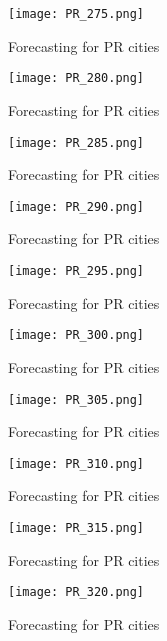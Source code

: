  \begin{figure}[!ht] 
 \centering 
 \texttt{[image: PR\_275.png]} 
 \caption{Forecasting for PR cities } 
 \label{fig:PR_275} 
 \end{figure} 
 
 \begin{figure}[!ht] 
 \centering 
 \texttt{[image: PR\_280.png]} 
 \caption{Forecasting for PR cities } 
 \label{fig:PR_280} 
 \end{figure} 
 
 \begin{figure}[!ht] 
 \centering 
 \texttt{[image: PR\_285.png]} 
 \caption{Forecasting for PR cities } 
 \label{fig:PR_285} 
 \end{figure} 
 
 \begin{figure}[!ht] 
 \centering 
 \texttt{[image: PR\_290.png]} 
 \caption{Forecasting for PR cities } 
 \label{fig:PR_290} 
 \end{figure} 
 
 \begin{figure}[!ht] 
 \centering 
 \texttt{[image: PR\_295.png]} 
 \caption{Forecasting for PR cities } 
 \label{fig:PR_295} 
 \end{figure} 
 
 \begin{figure}[!ht] 
 \centering 
 \texttt{[image: PR\_300.png]} 
 \caption{Forecasting for PR cities } 
 \label{fig:PR_300} 
 \end{figure} 
 
 \begin{figure}[!ht] 
 \centering 
 \texttt{[image: PR\_305.png]} 
 \caption{Forecasting for PR cities } 
 \label{fig:PR_305} 
 \end{figure} 
 
 \begin{figure}[!ht] 
 \centering 
 \texttt{[image: PR\_310.png]} 
 \caption{Forecasting for PR cities } 
 \label{fig:PR_310} 
 \end{figure} 
 
 \begin{figure}[!ht] 
 \centering 
 \texttt{[image: PR\_315.png]} 
 \caption{Forecasting for PR cities } 
 \label{fig:PR_315} 
 \end{figure} 
 
 \begin{figure}[!ht] 
 \centering 
 \texttt{[image: PR\_320.png]} 
 \caption{Forecasting for PR cities } 
 \label{fig:PR_320} 
 \end{figure} 
 
